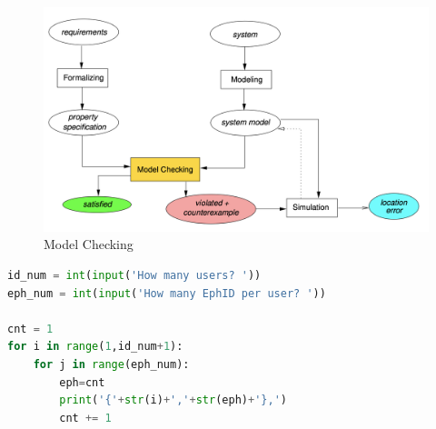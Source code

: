 \documentclass[a4paper, twocolumn]{article}
\begin{document}
\begin{figure}[h]
    \centering
    \includegraphics[scale=0.3]{images/modelCheck.png}
    \caption{Model Checking}
    \label{fig:modelCheck} 
\end{figure}
\begin{lstlisting}[language=Python, caption=id and EphID Generator,label={genEph}]
id_num = int(input('How many users? '))
eph_num = int(input('How many EphID per user? '))

cnt = 1
for i in range(1,id_num+1):
    for j in range(eph_num):
        eph=cnt
        print('{'+str(i)+','+str(eph)+'},')
        cnt += 1
\end{lstlisting} 
\end{document}
